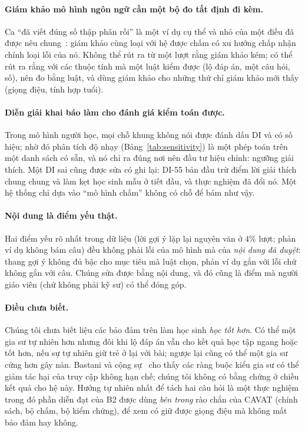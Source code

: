 \paragraph{Giám khảo mô hình ngôn ngữ cần một bộ đo tất định đi kèm.}
Ca ``đã viết đúng số thập phân rồi'' là một ví dụ cụ thể và nhỏ của một điều đã được nêu chung~\cite{zheng2023}: giám khảo cùng loại với hệ được chấm có xu hướng chấp nhận chính loại lỗi của nó. Không thể rút ra từ một lượt rằng giám khảo kém; có thể rút ra rằng với các thuộc tính mà một luật kiểm được (lộ đáp án, một câu hỏi, số), nên đo bằng luật, và dùng giám khảo cho những thứ chỉ giám khảo mới thấy (giọng điệu, tính hợp tuổi).

\paragraph{Diễn giải khai báo làm cho đánh giá kiểm toán được.}
Trong mô hình người học, mọi chỗ khung không nói được đánh dấu DI và có số hiệu; nhờ đó phân tích độ nhạy (Bảng~\ref{tab:sensitivity}) là một phép toán trên một danh sách có sẵn, và nó chỉ ra đúng nơi nên đầu tư hiệu chỉnh: ngưỡng giải thích. Một DI sai cũng được sửa có ghi lại: DI-55 bản đầu trừ điểm lời giải thích chung chung và làm kẹt học sinh mẫu ở tiết đầu, và thực nghiệm đã đổi nó. Một hệ thống chỉ dựa vào ``mô hình chấm'' không có chỗ để bám như vậy.

\paragraph{Nội dung là điểm yếu thật.}
Hai điểm yếu rõ nhất trong dữ liệu (lời gợi ý lặp lại nguyên văn ở $4\%$ lượt; phản ví dụ không bám câu) đều không phải lỗi của mô hình mà của \emph{nội dung đã duyệt}: thang gợi ý không đủ bậc cho mục tiêu mà luật chọn, phản ví dụ gắn với lỗi chứ không gắn với câu. Chúng sửa được bằng nội dung, và đó cũng là điểm mà người giáo viên (chứ không phải kỹ sư) có thể đóng góp.

\paragraph{Điều chưa biết.}
Chúng tôi chưa biết liệu các bảo đảm trên làm học sinh \emph{học tốt hơn}. Có thể một gia sư tự nhiên hơn nhưng đôi khi lộ đáp án vẫn cho kết quả học tập ngang hoặc tốt hơn, nếu sự tự nhiên giữ trẻ ở lại với bài; ngược lại cũng có thể một gia sư cứng hơn gây nản. Bastani và cộng sự~\cite{bastani2025} cho thấy các ràng buộc kiểu gia sư có thể giảm tác hại của truy cập không hạn chế; chúng tôi không có bằng chứng ở chiều kết quả cho hệ này. Hướng tự nhiên nhất để tách hai câu hỏi là một thực nghiệm trong đó phần diễn đạt của B2 được dùng \emph{bên trong} rào chắn của CAVAT (chính sách, bộ chấm, bộ kiểm chứng), để xem có giữ được giọng điệu mà không mất bảo đảm hay không.
